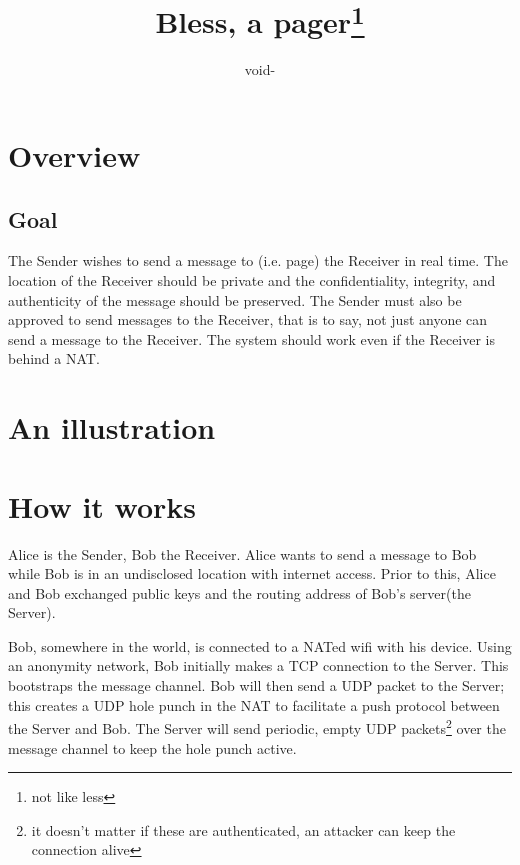 \documentclass[11pt]{article}
\title{Bless, a pager\footnote{not like less}}
\author{void-}
\begin{document}
\maketitle
\section*{Overview}
\subsection*{Goal}
The Sender wishes to send a message to (i.e. page) the Receiver in real time.
The location of the Receiver should be private and the confidentiality,
integrity, and authenticity of the message should be preserved. The Sender must
also be approved to send messages to the Receiver, that is to say, not just
anyone can send a message to the Receiver. The system should work even if the
Receiver is behind a NAT.

\section*{An illustration}

\section*{How it works}
Alice is the Sender, Bob the Receiver. Alice wants to send a message to Bob
while Bob is in an undisclosed location with internet access. Prior to this,
Alice and Bob exchanged public keys and the routing address of Bob's server(the
Server).

Bob, somewhere in the world, is connected to a NATed wifi with his device.
Using an anonymity network, Bob initially makes a TCP connection to the Server.
This bootstraps the message channel. Bob will then send a UDP packet to the
Server; this creates a UDP hole punch in the NAT to facilitate a push protocol
between the Server and Bob. The Server will send periodic, empty UDP
packets\footnote{it doesn't matter if these are authenticated, an attacker can
keep the connection alive}
over the message channel to keep the hole punch active.
\end{document}
